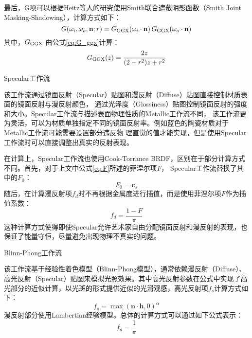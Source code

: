 最后，G项可以根据Heitz等人\cite{heitz2014understanding}的研究使用Smith联合遮蔽阴影函数（Smith Joint Masking-Shadowing），计算方式如下：
\begin{equation}
  \label{eq:G}
  G(\omega_i,\omega_o,{\bf{n}};r)=G_{\rm{GGX}}(\omega_i\cdot{\bf{n}})\,G_{\rm{GGX}}(\omega_o\cdot{\bf{n}})
\end{equation}
其中，$G_{\rm{GGX}}$ 由公式\eqref{eq:G_ggx}计算：
\begin{equation}
  \label{eq:G_ggx}
  G_{\rm{GGX}}(z)=\frac{2z}{(2-r^2)z+r^2}
\end{equation}

 Specular工作流

该工作流通过镜面反射（Specular）贴图和漫反射（Diffuse）贴图直接控制材质表面的镜面反射与漫反射颜色，
通过光泽度（Glossiness）贴图控制镜面反射的强度和大小。Specular工作流与描述表面物理性质的Metallic工作流不同，
该工作流更为灵活，可以为材质单独指定不同的镜面反射率。例如蓝色的陶瓷材质对于Metallic工作流可能需要设置部分违反物
理直觉的值才能实现，但是使用Specular工作流时可以直接调整出真实的反射表现。

在计算上，Specular工作流也使用Cook-Torrance BRDF，区别在于部分计算方式不同。首先，对于上文中公式\eqref{eq:F}所述的菲涅尔项$F$，
Specular工作流替换了其中的$F_0$：
\begin{equation}\label{eq:F0_spec}
F_0=\bm{c}_s
\end{equation}
随后，在计算漫反射项$f_d$时不再根据金属度进行插值，而是使用菲涅尔项$F$作为插值系数：
\begin{equation}\label{eq:diffuse_spec}
f_d=\frac{1-F}{\pi}
\end{equation}
这种计算方式使得即使Specular允许艺术家自由分配镜面反射和漫反射的表现，也保证了能量守恒，尽量避免出现物理不真实的问题。

 Blinn-Phong工作流

该工作流基于经验性着色模型（Blinn-Phong模型），通常依赖漫反射（Diffuse）、高光反射（Specular）贴图来模拟光照效果。其中高光反射参数在公式中实现了高光部分的近似计算，以光斑的形式提供近似的光滑观感，高光反射项$f_s$计算方式如下：
\begin{equation}\label{eq:specular_BlinnPhong}
f_s=\max(\mathbf{n}\cdot \mathbf{h},0)^\alpha
\end{equation}
漫反射部分使用Lambertian经验模型。总体的计算方式可以通过如下公式表示：
\begin{equation}\label{eq:diffuse_BlinnPhong}
f_d=\frac{1}{\pi}
\end{equation}

